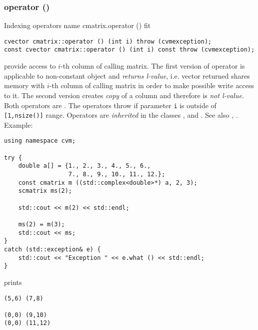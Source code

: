 \subsubsection{operator ()}
Indexing operators%
\pdfdest name {cmatrix.operator ()} fit
\begin{verbatim}
cvector cmatrix::operator () (int i) throw (cvmexception);
const cvector cmatrix::operator () (int i) const throw (cvmexception);
\end{verbatim}
provide access to \hbox{$i$-th} column of calling matrix. The first version
of operator is applicable to  non-constant object and
\emph{returns  l-value}, i.e. vector returned shares memory
with \hbox{$i$-th} column of calling matrix
in order to make possible write access to it.
The second version creates  \emph{copy} of a column and therefore is
\emph{not  l-value}.
Both operators are \Based.
The operators throw 
if parameter \verb"i" is outside of \verb"[1,nsize()]" range.
Operators are \emph{inherited}
in the classes
,  
and .
See also ,
.
Example:
\begin{Verbatim}
using namespace cvm;

try {
    double a[] = {1., 2., 3., 4., 5., 6.,
                  7., 8., 9., 10., 11., 12.};
    const cmatrix m ((std::complex<double>*) a, 2, 3);
    scmatrix ms(2);

    std::cout << m(2) << std::endl;

    ms(2) = m(3);
    std::cout << ms;
}
catch (std::exception& e) {
    std::cout << "Exception " << e.what () << std::endl;
}
\end{Verbatim}
prints
\begin{Verbatim}
(5,6) (7,8)

(0,0) (9,10)
(0,0) (11,12)
\end{Verbatim}
\newpage




